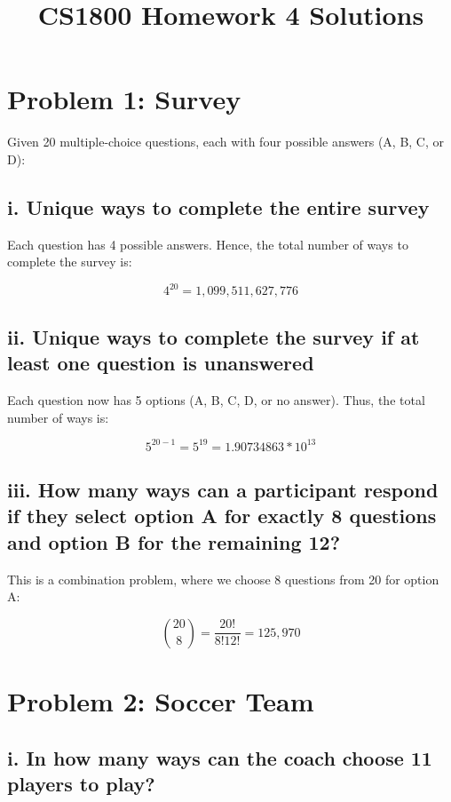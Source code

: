 \documentclass{article}
\title{CS1800 Homework 4 Solutions}
\author{}
\date{}
\begin{document}
\maketitle
\newpage

\section*{Problem 1: Survey}

Given 20 multiple-choice questions, each with four possible answers (A, B, C, or D):

\subsection*{i. Unique ways to complete the entire survey}

Each question has 4 possible answers. Hence, the total number of ways to complete the survey is:

\[
4^{20} = 1,099,511,627,776
\]

\subsection*{ii. Unique ways to complete the survey if at least one question is unanswered}

Each question now has 5 options (A, B, C, D, or no answer). Thus, the total number of ways is:

\[
5^{20-1} = 5^{19} = 1.90734863* 10^{13}
\]

\subsection*{iii. How many ways can a participant respond if they select option A for exactly 8 questions and option B for the remaining 12?}

This is a combination problem, where we choose 8 questions from 20 for option A:

\[
\binom{20}{8} = \frac{20!}{8!12!} = 125,970
\]

\newpage

\section*{Problem 2: Soccer Team}

\subsection*{i. In how many ways can the coach choose 11 players to play?}
\end{document}
